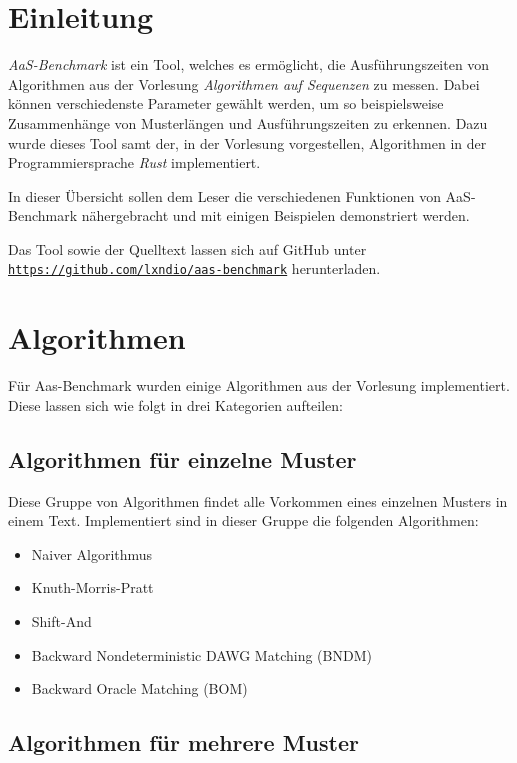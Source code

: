 \documentclass[twocolumn]{article}
\begin{document}
\section{Einleitung}

\textit{AaS-Benchmark} ist ein Tool, welches es ermöglicht, die Ausführungszeiten von Algorithmen aus der Vorlesung \textit{Algorithmen auf Sequenzen} zu messen. Dabei können verschiedenste Parameter gewählt werden, um so beispielsweise Zusammenhänge von Musterlängen und Ausführungszeiten zu erkennen. Dazu wurde dieses Tool samt der, in der Vorlesung vorgestellen, Algorithmen in der Programmiersprache \textit{Rust} implementiert.

In dieser Übersicht sollen dem Leser die verschiedenen Funktionen von AaS-Benchmark nähergebracht und mit einigen Beispielen demonstriert werden.

Das Tool sowie der Quelltext lassen sich auf GitHub unter \hyperlink{https://github.com/lxndio/aas-benchmark}{\texttt{https://github.com/lxndio/aas-benchmark}} herunterladen.

\section{Algorithmen}

Für Aas-Benchmark wurden einige Algorithmen aus der Vorlesung implementiert. Diese lassen sich wie folgt in drei Kategorien aufteilen:

\subsection{Algorithmen für einzelne Muster}

Diese Gruppe von Algorithmen findet alle Vorkommen eines einzelnen Musters in einem Text. Implementiert sind in dieser Gruppe die folgenden Algorithmen:

\begin{itemize}
    \setlength\itemsep{0em}
    \item Naiver Algorithmus
    \item Knuth-Morris-Pratt
    \item Shift-And
    \item Backward Nondeterministic DAWG Matching (BNDM)
    \item Backward Oracle Matching (BOM)
\end{itemize}

\subsection{Algorithmen für mehrere Muster}
\end{document}
